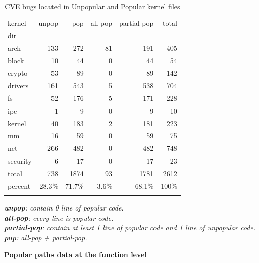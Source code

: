 \begin{table}
\small
\caption{CVE bugs located in Unpopular and Popular kernel files}
\label{tab:cve_files}
\begin{tabular}{l|r|r|r|r|r}
 kernel & unpop & pop & all-pop & partial-pop & total \\
 dir & \color{red}{(CVEs)} & \color{red}{(CVEs)} & \color{red}{(CVEs)} & \color{red}{(CVEs)} & \\
 \hline
 arch & 133\color{red}{(3)} & 272\color{red}{(1)} & 81 & 191\color{red}{(1)} & 405 \\
 \hline
 block & 10 & 44 & 0 & 44 & 54 \\
 \hline
 crypto & 53\color{red}{(1)} & 89\color{red}{(2)} & 0 & 89\color{red}{(2)} & 142 \\
 \hline
 drivers & 161\color{red}{(11)} & 543\color{red}{(3)} & 5 & 538\color{red}{(3)} & 704 \\
 \hline
 fs & 52\color{red}{(6)} & 176\color{red}{(2)} & 5 & 171\color{red}{(2)} & 228 \\
 \hline
 ipc & 1 & 9 & 0 & 9 & 10 \\
 \hline
 kernel & 40\color{red}{(2)} & 183 & 2 & 181 & 223 \\
 \hline
 mm & 16\color{red}{(1)} & 59\color{red}{(4)} & 0 & 59\color{red}{(4)} & 75 \\
 \hline
 net & 266\color{red}{(5)} & 482\color{red}{(3)} & 0 & 482\color{red}{(3)} & 748 \\
 \hline
 security & 6 & 17 & 0 & 17 & 23 \\
 \hline
 total & 738\color{red}{(29)} & 1874\color{red}{(15)} & 93 & 1781\color{red}{(15)} & 2612 \\
 \hline 
 percent & 28.3\% & 71.7\% & 3.6\% & 68.1\% & 100\% \\
 & \color{red}{(66\%)} & \color{red}{(34\%)} & \color{red}{(0\%)} & \color{red}{(34\%)} &
\end{tabular}
\textit{\textbf{unpop}: contain 0 line of popular code.} \\
\textit{\textbf{all-pop}: every line is popular code.} \\
\textit{\textbf{partial-pop}: contain at least 1 line of popular code and 1 line of unpopular code.} \\
\textit{\textbf{pop}: all-pop + partial-pop.}
\end{table}

\noindent
\textbf{Popular paths data at the function level}
\newline

